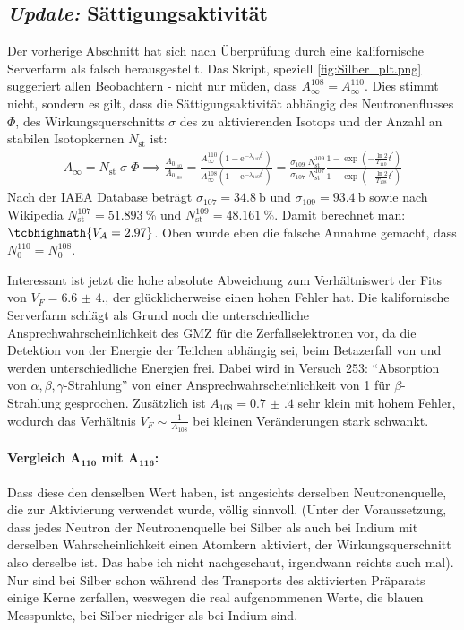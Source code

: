 \subsection{\textcolor{blueurllink}{\emph{Update:}} Sättigungsaktivität}
Der vorherige Abschnitt hat sich nach Überprüfung durch eine kalifornische Serverfarm als falsch herausgestellt. Das Skript, speziell \cref{fig:Silber_plt.png} suggeriert allen Beobachtern - nicht nur müden, dass \(A^{108}_\infty=A^{110}_\infty\). Dies stimmt nicht, sondern es gilt, dass die Sättigungsaktivität abhängig des Neutronenflusses \(\Phi\), des Wirkungsquerschnitts \(\sigma\) des zu aktivierenden Isotops und der Anzahl an stabilen Isotopkernen \(N_{\mathrm{st}}\) ist:\autocite{Neutronenaktivierung}
\begin{align}
    A_\infty=N_{\mathrm{st}}\;\sigma\;\Phi \implies\frac{A_{0_{110}}}{A_{0_{108}}}=\frac{A^{110}_\infty(1-\mathrm{e}^{-\lambda_{110} t^\prime})}{A^{108}_\infty(1-\mathrm{e}^{-\lambda_{110} t^\prime})}=\frac{\sigma_{109}\;N^{109}_{\mathrm{st}}}{\sigma_{107}\;N^{107}_{\mathrm{st}}}\frac{1-\exp\left(-\frac{\ln 2}{T_{110}} t^\prime\right)}{1-\exp\left(-\frac{\ln 2}{T_{108}} t^\prime\right)}
\end{align}
Nach der IAEA Database\autocite{live_nuclide_chart} beträgt \(\sigma_{107}=\qty{34.8}{\barn}\) und \(\sigma_{109}=\qty{93.4}{\barn}\) sowie nach Wikipedia\autocite{Silber} \(N^{107}_{\mathrm{st}}=\qty{51.893}{\percent}\) und \(N^{109}_{\mathrm{st}}=\qty{48.161}{\percent}\). Damit berechnet man: \(\tcbhighmath{V_A=2.97}\). Oben wurde eben die falsche Annahme gemacht, dass \(N^{110}_0=N^{108}_0\). 

Interessant ist jetzt die hohe absolute Abweichung zum Verhältniswert der Fits von \(V_F=\num{6.6(4.0)}\), der glücklicherweise einen hohen Fehler hat. Die kalifornische Serverfarm schlägt als Grund noch die unterschiedliche Ansprechwahrscheinlichkeit des GMZ für die Zerfallselektronen vor, da die Detektion von der Energie der Teilchen abhängig sei, beim Betazerfall von  und  werden unterschiedliche Energien frei. Dabei wird in Versuch 253: \enquote{Absorption von \(\alpha,\beta,\gamma\)-Strahlung} von einer Ansprechwahrscheinlichkeit von 1 für \(\beta\)-Strahlung gesprochen. Zusätzlich ist \(A_{108}=\num{0.7(4)}\) sehr klein mit hohem Fehler, wodurch das Verhältnis \(V_F\sim\frac{1}{A_{108}}\) bei kleinen Veränderungen stark schwankt. 

\paragraph{Vergleich \(\boldsymbol{A_{110}}\) mit \(\boldsymbol{A_{116}}\):}
Dass diese den denselben Wert haben, ist angesichts derselben Neutronenquelle, die zur Aktivierung verwendet wurde, völlig sinnvoll. (Unter der Voraussetzung, dass jedes Neutron der Neutronenquelle bei Silber als auch bei Indium mit derselben Wahrscheinlichkeit einen Atomkern aktiviert, der Wirkungsquerschnitt also derselbe ist. Das habe ich nicht nachgeschaut, irgendwann reichts auch mal). Nur sind bei Silber schon während des Transports des aktivierten Präparats einige Kerne zerfallen, weswegen die real aufgenommenen Werte, die blauen Messpunkte, bei Silber niedriger als bei Indium sind. 

